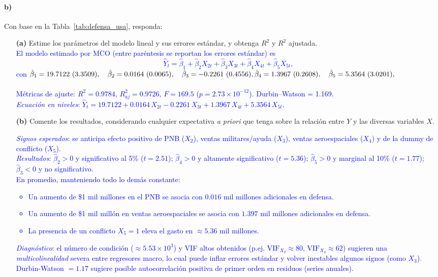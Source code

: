 \documentclass[10pt]{article}
\begin{document}
\paragraph*{b)} Con base en la Tabla~\ref{tab:defensa_usa}, responda:
\begin{enumerate}
    \item[\textbf{(a)}] Estime los parámetros del modelo lineal y sus errores estándar, y obtenga $R^2$ y $R^2$ ajustada.\\
    \textcolor{blue}{
        El modelo estimado por MCO (entre paréntesis se reportan los errores estándar) es
        \[
        \widehat{Y}_t=\hat{\beta}_1+\hat{\beta}_2X_{2t}+\hat{\beta}_3X_{3t}+\hat{\beta}_4X_{4t}+\hat{\beta}_5X_{5t},
        \]
        con
        $\hat{\beta}_1=19.7122\ (3.3509),\quad \hat{\beta}_2=0.0164\ (0.0065),\quad \hat{\beta}_3=-0.2261\ (0.4556),\\
        \hat{\beta}_4=1.3967\ (0.2608),\quad \hat{\beta}_5=5.3564\ (3.0201),$ \\
        \\
        Métricas de ajuste: \(R^2=0.9784\), \(R^2_{aj}=0.9726\), \(F=169.5\) (\(p=2.73\times10^{-12}\)). Durbin–Watson = 1.169.\\
        \textit{Ecuación en niveles}: \(\widehat{Y}_t=19.7122+0.0164\,X_{2t}-0.2261\,X_{3t}+1.3967\,X_{4t}+5.3564\,X_{5t}.\)
    }

    \item[\textbf{(b)}] Comente los resultados, considerando cualquier expectativa \textit{a priori}  que tenga sobre la relación entre $Y$ y las diversas variables $X$.\\
    \textcolor{blue}{
        \emph{Signos esperados}: se anticipa efecto positivo de PNB (\(X_2\)), ventas militares/ayuda (\(X_3\)), ventas aeroespaciales (\(X_4\)) y de la dummy de conflicto (\(X_5\)).\\
        \emph{Resultados}: \(\hat{\beta}_2>0\) y significativo al 5\% (\(t=2.51\)); \(\hat{\beta}_4>0\) y altamente significativo (\(t=5.36\)); \(\hat{\beta}_5>0\) y marginal al 10\% (\(t=1.77\)); \(\hat{\beta}_3<0\) y no significativo. \\
        En promedio, manteniendo todo lo demás constante:
        \begin{itemize}
        \item Un aumento de \$1 mil millones en el PNB se asocia con \(0.016\) mil millones adicionales en defensa.
        \item Un aumento de \$1 mil millón en ventas aeroespaciales se asocia con \(1.397\) mil millones adicionales en defensa.
        \item La presencia de un conflicto \(X_5=1\) eleva el gasto en \(\approx 5.36\) mil millones.
        \end{itemize}
        \emph{Diagnóstico}: el número de condición (\(\approx 5.53\times10^3\)) y VIF altos obtenidos (p.ej. \(\text{VIF}_{X_2}\approx 80\), \(\text{VIF}_{X_4}\approx 62\)) sugieren  una \textit{multicolinealidad} severa entre regresores macro, lo cual puede inflar errores estándar y volver inestables algunos signos (como \(X_3\)). Durbin-Watson \(=1.17\) sugiere posible autocorrelación positiva de primer orden en residuos (series anuales).
    }


\end{enumerate}
\end{document}
